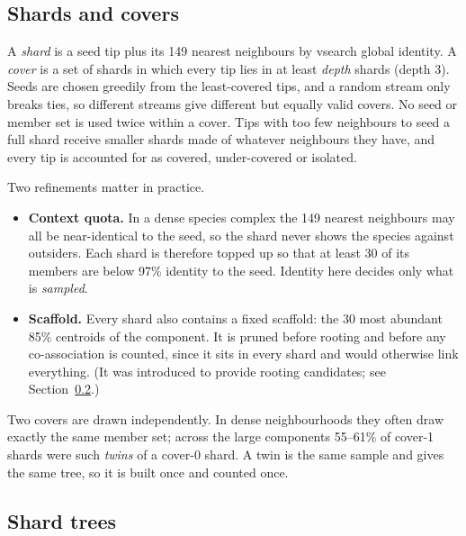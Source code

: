 \documentclass[11pt,a4paper]{article}
\begin{document}
\subsection{Shards and covers}\label{sec:covers}

A \emph{shard} is a seed tip plus its 149 nearest neighbours by vsearch global identity. A
\emph{cover} is a set of shards in which every tip lies in at least \emph{depth} shards (depth 3).
Seeds are chosen greedily from the least-covered tips, and a random stream only breaks ties, so
different streams give different but equally valid covers. No seed or member set is used twice
within a cover. Tips with too few neighbours to seed a full shard receive smaller shards made of
whatever neighbours they have, and every tip is accounted for as covered, under-covered or isolated.

Two refinements matter in practice.
\begin{itemize}
  \item \textbf{Context quota.} In a dense species complex the 149 nearest neighbours may all be
        near-identical to the seed, so the shard never shows the species against outsiders. Each
        shard is therefore topped up so that at least 30 of its members are below 97\% identity to
        the seed. Identity here decides only what is \emph{sampled}.
  \item \textbf{Scaffold.} Every shard also contains a fixed scaffold: the 30 most abundant 85\%
        centroids of the component. It is pruned before rooting and before any co-association is
        counted, since it sits in every shard and would otherwise link everything. (It was
        introduced to provide rooting candidates; see Section~\ref{sec:trees}.)
\end{itemize}

Two covers are drawn independently. In dense neighbourhoods they often draw exactly the same
member set; across the large components 55--61\% of cover-1 shards were such \emph{twins} of a
cover-0 shard. A twin is the same sample and gives the same tree, so it is built once and counted
once.

\subsection{Shard trees}\label{sec:trees}
\end{document}
